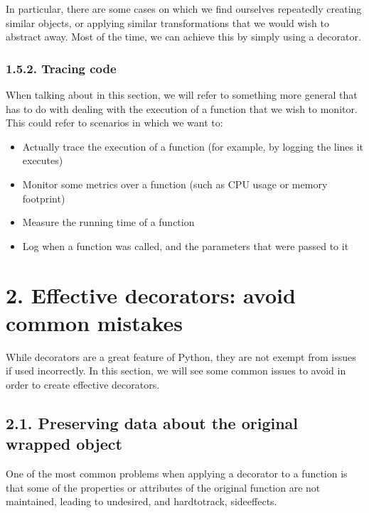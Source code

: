 \documentclass[a4paper,10pt,english]{sphinxmanual}
\begin{document}
In particular, there are some cases on which we find ourselves repeatedly creating similar
objects, or applying similar transformations that we would wish to abstract away. Most of
the time, we can achieve this by simply using a decorator.


\subsubsection{1.5.2. Tracing code}
\label{\detokenize{chapters/5_decorators/index:tracing-code}}
When talking about  in this section, we will refer to something more general that has
to do with dealing with the execution of a function that we wish to monitor. This could
refer to scenarios in which we want to:
\begin{itemize}
\item {} 
Actually trace the execution of a function (for example, by logging the lines it executes)

\item {} 
Monitor some metrics over a function (such as CPU usage or memory footprint)

\item {} 
Measure the running time of a function

\item {} 
Log when a function was called, and the parameters that were passed to it

\end{itemize}


\section{2. Effective decorators: avoid common mistakes}
\label{\detokenize{chapters/5_decorators/index:effective-decorators-avoid-common-mistakes}}
While decorators are a great feature of Python, they are not exempt from issues if used
incorrectly. In this section, we will see some common issues to avoid in order to create
effective decorators.


\subsection{2.1. Preserving data about the original wrapped object}
\label{\detokenize{chapters/5_decorators/index:preserving-data-about-the-original-wrapped-object}}
One of the most common problems when applying a decorator to a function is that some of
the properties or attributes of the original function are not maintained, leading to
undesired, and hard\sphinxhyphen{}to\sphinxhyphen{}track, side\sphinxhyphen{}effects.
\end{document}
